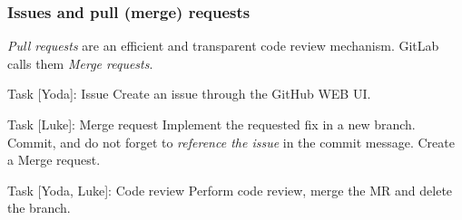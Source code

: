 
\begin{frame}[fragile]
	
\frametitle{Issues and pull (merge) requests}

\emph{Pull requests} are an efficient and transparent code review mechanism. GitLab calls them \emph{Merge requests}.

\begin{block}{Task [Yoda]: Issue}
Create an issue through the GitHub WEB UI.
\end{block}	

\begin{block}{Task [Luke]: Merge request}
Implement the requested fix in a new branch. Commit, and do not forget to \emph{reference the issue} in the commit message. Create a Merge request.
\end{block}	

\begin{block}{Task [Yoda, Luke]: Code review}
Perform code review, merge the MR and delete the branch.
\end{block}	


\end{frame}


%	
%	
%
%	
%	

